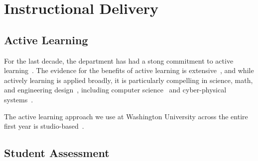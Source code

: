 \section{Instructional Delivery}
\label{sec:delivery}

\subsection{Active Learning}

For the last decade, the department has had a stong commitment to
active learning~\cite{scbggg10,sgcggt10}.
The evidence for the benefits of active learning is
extensive~\cite{jjs98,lst99,Prince04,rss97},
and while actively learning is applied broadly, it is particularly
compelling in science, math, and engineering
design~\cite{Freeman14,lst99,Hake98,Byerley01,kb06}, including computer
science~\cite{McConnell96,tlb01,skltc10,ag13}
and cyber-physical systems~\cite{me14,mmy16}.

The active learning approach we use at Washington University across the entire
first year is studio-based~\cite{hnc08}.

\subsection{Student Assessment}

